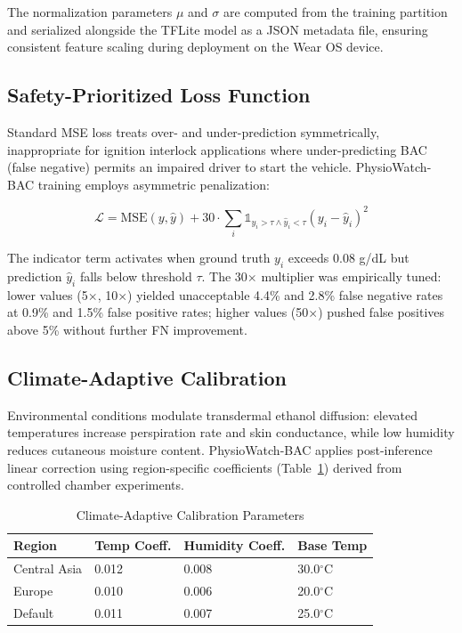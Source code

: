 \documentclass[HARVARD,Times2COL]{WileyNJDv5}
\begin{document}
The normalization parameters $\mu$ and $\sigma$ are computed from the training partition and serialized alongside the TFLite model as a JSON metadata file, ensuring consistent feature scaling during deployment on the Wear OS device.

\subsection{Safety-Prioritized Loss Function}
Standard MSE loss treats over- and under-prediction symmetrically, inappropriate for ignition interlock applications where under-predicting BAC (false negative) permits an impaired driver to start the vehicle. PhysioWatch-BAC training employs asymmetric penalization:

\begin{equation}
\mathcal{L} = \text{MSE}(y, \hat{y}) + 30 \cdot \sum_{i} \mathbb{1}_{y_i > \tau \land \hat{y}_i < \tau} (y_i - \hat{y}_i)^2
\end{equation}

The indicator term activates when ground truth $y_i$ exceeds 0.08 g/dL but prediction $\hat{y}_i$ falls below threshold $\tau$. The 30$\times$ multiplier was empirically tuned: lower values (5$\times$, 10$\times$) yielded unacceptable 4.4\% and 2.8\% false negative rates at 0.9\% and 1.5\% false positive rates; higher values (50$\times$) pushed false positives above 5\% without further FN improvement.
\subsection{Climate-Adaptive Calibration}
Environmental conditions modulate transdermal ethanol diffusion: elevated temperatures increase perspiration rate and skin conductance, while low humidity reduces cutaneous moisture content. PhysioWatch-BAC applies post-inference linear correction using region-specific coefficients (Table~\ref{tab:climate}) derived from controlled chamber experiments.
\begin{table}[htbp]
\caption{Climate-Adaptive Calibration Parameters}
\label{tab:climate}
\centering
\small
\begin{tabular}{@{}llll@{}}
\toprule
\textbf{Region} & \textbf{Temp Coeff.} & \textbf{Humidity Coeff.} & \textbf{Base Temp} \\
\midrule
Central Asia & 0.012 & 0.008 & 30.0$^\circ$C \\
Europe & 0.010 & 0.006 & 20.0$^\circ$C \\
Default & 0.011 & 0.007 & 25.0$^\circ$C \\
\bottomrule
\end{tabular}
\end{table}
\end{document}
